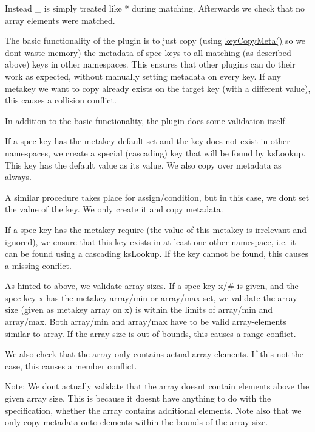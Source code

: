 Instead {\ttfamily \+\_\+} is simply treated like {\ttfamily $\ast$} during matching. Afterwards we check that no array elements were matched.

The basic functionality of the plugin is to just copy (using {\ttfamily \hyperlink{group__keymeta_ga9a22b992478e613c8788bd460b4a1f0c}{key\+Copy\+Meta()}} so we don\textquotesingle{}t waste memory) the metadata of spec keys to all matching (as described above) keys in other namespaces. This ensures that other plugins can do their work as expected, without manually setting metadata on every key. If any metakey we want to copy already exists on the target key (with a different value), this causes a {\ttfamily collision} conflict.

In addition to the basic functionality, the plugin does some validation itself.

If a spec key has the metakey {\ttfamily default} set and the key does not exist in other namespaces, we create a special (cascading) key that will be found by {\ttfamily ks\+Lookup}. This key has the {\ttfamily default} value as its value. We also copy over metadata as always.

A similar procedure takes place for {\ttfamily assign/condition}, but in this case, we don\textquotesingle{}t set the value of the key. We only create it and copy metadata.

If a spec key has the metakey {\ttfamily require} (the value of this metakey is irrelevant and ignored), we ensure that this key exists in at least one other namespace, i.\+e. it can be found using a cascading {\ttfamily ks\+Lookup}. If the key cannot be found, this causes a {\ttfamily missing} conflict.

As hinted to above, we validate array sizes. If a spec key {\ttfamily x/\#} is given, and the spec key {\ttfamily x} has the metakey {\ttfamily array/min} or {\ttfamily array/max} set, we validate the array size (given as metakey {\ttfamily array} on {\ttfamily x}) is within the limits of {\ttfamily array/min} and {\ttfamily array/max}. Both {\ttfamily array/min} and {\ttfamily array/max} have to be valid array-\/elements similar to {\ttfamily array}. If the array size is out of bounds, this causes a {\ttfamily range} conflict.

We also check that the array only contains actual array elements. If this not the case, this causes a {\ttfamily member} conflict.

Note\+: We don\textquotesingle{}t actually validate that the array doesn\textquotesingle{}t contain elements above the given array size. This is because it doesn\textquotesingle{}t have anything to do with the specification, whether the array contains additional elements. Note also that we only copy metadata onto elements within the bounds of the array size.

